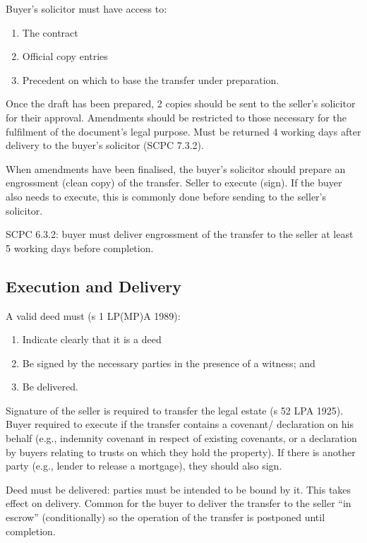 \documentclass[
]{article}
\providecommand{\tightlist}{%
  \setlength{\itemsep}{0pt}\setlength{\parskip}{0pt}}
\begin{document}
Buyer's solicitor must have access to:

\begin{enumerate}
\tightlist
\item
  The contract
\item
  Official copy entries
\item
  Precedent on which to base the transfer under preparation.
\end{enumerate}

Once the draft has been prepared, 2 copies should be sent to the
seller's solicitor for their approval. Amendments should be restricted
to those necessary for the fulfilment of the document's legal purpose.
Must be returned 4 working days after delivery to the buyer's solicitor
(SCPC 7.3.2).

When amendments have been finalised, the buyer's solicitor should
prepare an engrossment (clean copy) of the transfer. Seller to execute
(sign). If the buyer also needs to execute, this is commonly done before
sending to the seller's solicitor.

SCPC 6.3.2: buyer must deliver engrossment of the transfer to the seller
at least 5 working days before completion.

\hypertarget{execution-and-delivery}{%
\subsection{Execution and Delivery}\label{execution-and-delivery}}

A valid deed must (s 1 LP(MP)A 1989):

\begin{enumerate}
\tightlist
\item
  Indicate clearly that it is a deed
\item
  Be signed by the necessary parties in the presence of a witness; and
\item
  Be delivered.
\end{enumerate}

Signature of the seller is required to transfer the legal estate (s 52
LPA 1925). Buyer required to execute if the transfer contains a
covenant/ declaration on his behalf (e.g., indemnity covenant in respect
of existing covenants, or a declaration by buyers relating to trusts on
which they hold the property). If there is another party (e.g., lender
to release a mortgage), they should also sign.

Deed must be delivered: parties must be intended to be bound by it. This
takes effect on delivery. Common for the buyer to deliver the transfer
to the seller ``in escrow'' (conditionally) so the operation of the
transfer is postponed until completion.
\end{document}
